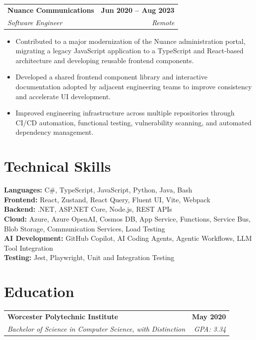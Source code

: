 \documentclass[letterpaper,10pt]{article}
\newcommand{\resumeSubheading}[4]{
    \begin{tabularx}{\textwidth}{X r}
        \textbf{#1} & \textbf{#2} \\
        \textit{\color{muted}#3} & \textit{\color{muted}#4}
    \end{tabularx}
    \vspace{-3pt}
}
\newcommand{\resumeBullet}[1]{
    \item #1
}
\begin{document}
\vspace{2pt}

\resumeSubheading
    {Nuance Communications}{Jun 2020 -- Aug 2023}
    {Software Engineer}{Remote}

\begin{itemize}

    \resumeBullet{
        Contributed to a major modernization of the Nuance
        administration portal, migrating a legacy JavaScript
        application to a TypeScript and React-based architecture
        and developing reusable frontend components.
    }

    \resumeBullet{
        Developed a shared frontend component library and
        interactive documentation adopted by adjacent engineering
        teams to improve consistency and accelerate UI development.
    }

    \resumeBullet{
        Improved engineering infrastructure across multiple
        repositories through CI/CD automation, functional testing,
        vulnerability scanning, and automated dependency
        management.
    }

\end{itemize}

\section{Technical Skills}

\textbf{Languages:} C\#, TypeScript, JavaScript, Python, Java, Bash \\
\textbf{Frontend:} React, Zustand, React Query, Fluent UI, Vite, Webpack \\
\textbf{Backend:} .NET, ASP.NET Core, Node.js, REST APIs \\
\textbf{Cloud:} Azure, Azure OpenAI, Cosmos DB, App Service, Functions,
Service Bus, Blob Storage, Communication Services, Load Testing \\
\textbf{AI Development:} GitHub Copilot, AI Coding Agents, Agentic
Workflows, LLM Tool Integration \\
\textbf{Testing:} Jest, Playwright, Unit and Integration Testing

\section{Education}

\resumeSubheading
    {Worcester Polytechnic Institute}{May 2020}
    {Bachelor of Science in Computer Science, with Distinction}
    {GPA: 3.34}
\end{document}
